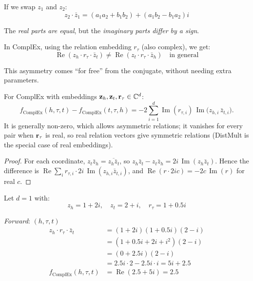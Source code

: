 \begin{notechapter}
\begin{intuition}
If we swap $z_1$ and $z_2$:
\[
z_2 \cdot \bar{z}_1 = (a_1 a_2 + b_1 b_2) + (a_1 b_2 - b_1 a_2)i
\]

The \emph{real parts are equal}, but the \emph{imaginary parts differ by a sign}.

In ComplEx, using the relation embedding $r_\tau$ (also complex), we get:
\[
\operatorname{Re}(z_h \cdot r_\tau \cdot \bar{z}_t) \neq \operatorname{Re}(z_t \cdot r_\tau \cdot \bar{z}_h) \quad \text{in general}
\]

This asymmetry comes ``for free'' from the conjugate, without needing extra parameters.
\end{intuition}

\begin{proposition}
For ComplEx with embeddings $\mathbf{z}_h, \mathbf{z}_t, \mathbf{r}_\tau \in \mathbb{C}^d$:
\begin{equation}
f_{\text{ComplEx}}(h, \tau, t) - f_{\text{ComplEx}}(t, \tau, h) = -2 \sum_{i=1}^{d} \operatorname{Im}(r_{\tau,i})\,\operatorname{Im}\bigl(z_{h,i}\,\bar z_{t,i}\bigr).
\end{equation}
It is generally non-zero, which allows asymmetric relations; it vanishes for every pair when $\mathbf{r}_\tau$ is real, so real relation vectors give symmetric relations (DistMult is the special case of real embeddings).
\end{proposition}

\begin{proof}
For each coordinate, $z_t\bar z_h = \overline{z_h\bar z_t}$, so $z_h\bar z_t - z_t\bar z_h = 2i\,\operatorname{Im}(z_h\bar z_t)$. Hence the difference is $\operatorname{Re}\sum_i r_{\tau,i}\cdot 2i\,\operatorname{Im}(z_{h,i}\bar z_{t,i})$, and $\operatorname{Re}(r\cdot 2ic) = -2c\,\operatorname{Im}(r)$ for real $c$.
\end{proof}

\begin{example}
Let $d = 1$ with:
\[
z_h = 1 + 2i, \quad z_t = 2 + i, \quad r_\tau = 1 + 0.5i
\]

\emph{Forward}: $(h, \tau, t)$
\begin{align*}
z_h \cdot r_\tau \cdot \bar{z}_t &= (1 + 2i)(1 + 0.5i)(2 - i) \\
&= (1 + 0.5i + 2i + i^2)(2 - i) \\
&= (0 + 2.5i)(2 - i) \\
&= 2.5i \cdot 2 - 2.5i \cdot i = 5i + 2.5 \\
f_{\text{ComplEx}}(h, \tau, t) &= \operatorname{Re}(2.5 + 5i) = 2.5
\end{align*}


\end{example}
\end{notechapter}
